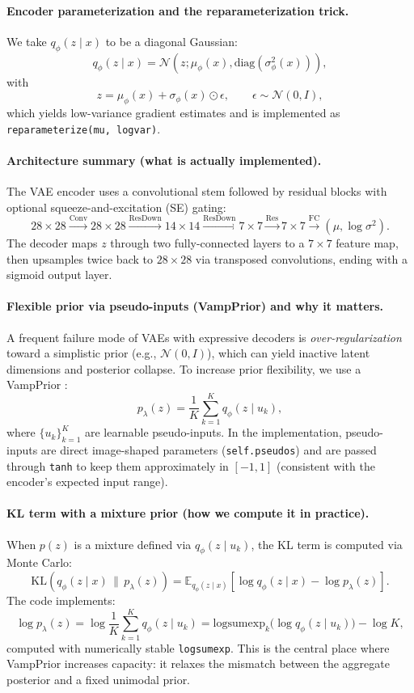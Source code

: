 \paragraph{Encoder parameterization and the reparameterization trick.}
We take $q_\phi(z\mid x)$ to be a diagonal Gaussian:
\[
q_\phi(z\mid x)=\mathcal{N}\!\left(z;\mu_\phi(x),\mathrm{diag}(\sigma^2_\phi(x))\right),
\]
with
\[
z = \mu_\phi(x) + \sigma_\phi(x)\odot \epsilon,\qquad \epsilon \sim \mathcal{N}(0,I),
\]
which yields low-variance gradient estimates and is implemented as \texttt{reparameterize(mu, logvar)}.

\paragraph{Architecture summary (what is actually implemented).}
The VAE encoder uses a convolutional stem followed by residual blocks with optional squeeze-and-excitation (SE) gating:
\[
28\!\times\!28 \xrightarrow{\text{Conv}} 28\!\times\!28 \xrightarrow{\text{ResDown}} 14\!\times\!14 \xrightarrow{\text{ResDown}} 7\!\times\!7 \xrightarrow{\text{Res}} 7\!\times\!7 \xrightarrow{\text{FC}} (\mu,\log\sigma^2).
\]
The decoder maps $z$ through two fully-connected layers to a $7\!\times\!7$ feature map, then upsamples twice back to $28\!\times\!28$ via transposed convolutions, ending with a sigmoid output layer.

\paragraph{Flexible prior via pseudo-inputs (VampPrior) and why it matters.}
A frequent failure mode of VAEs with expressive decoders is \emph{over-regularization} toward a simplistic prior (e.g., $\mathcal{N}(0,I)$), which can yield inactive latent dimensions and posterior collapse. To increase prior flexibility, we use a VampPrior \citep{tomczak2018vampprior}:
\[
p_\lambda(z)=\frac{1}{K}\sum_{k=1}^K q_\phi(z\mid u_k),
\]
where $\{u_k\}_{k=1}^K$ are learnable pseudo-inputs. In the implementation, pseudo-inputs are direct image-shaped parameters (\texttt{self.pseudos}) and are passed through \texttt{tanh} to keep them approximately in $[-1,1]$ (consistent with the encoder's expected input range).

\paragraph{KL term with a mixture prior (how we compute it in practice).}
When $p(z)$ is a mixture defined via $q_\phi(z\mid u_k)$, the KL term is computed via Monte Carlo:
\[
\mathrm{KL}\!\left(q_\phi(z\mid x)\,\|\,p_\lambda(z)\right)
=
\mathbb{E}_{q_\phi(z\mid x)}\!\left[\log q_\phi(z\mid x) - \log p_\lambda(z)\right].
\]
The code implements:
\[
\log p_\lambda(z)=\log \frac{1}{K}\sum_{k=1}^K q_\phi(z\mid u_k)
=
\mathrm{logsumexp}_k\big(\log q_\phi(z\mid u_k)\big)-\log K,
\]
computed with numerically stable \texttt{logsumexp}. This is the central place where VampPrior increases capacity: it relaxes the mismatch between the aggregate posterior and a fixed unimodal prior.

